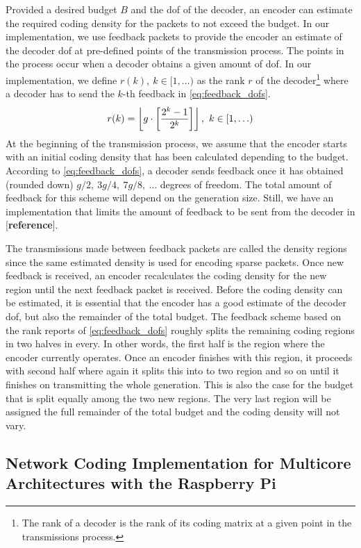 Provided a desired budget $B$ and the \ac{dof} of the decoder, an encoder
can estimate the required coding density for the packets to not exceed the
budget. In our implementation, we use feedback packets to provide the
encoder an estimate of the decoder \ac{dof} at pre-defined points of the
transmission process. The points in the process occur when a decoder
obtains a given amount of \ac{dof}. In our implementation, we define $r(k),\
k \in [1, \ldots)$ as the rank $r$ of the decoder\footnote{The rank of
a decoder is the rank of its coding matrix at a given point in the
transmissions process.} where a decoder has to send the $k$-th feedback in
\eqref{eq:feedback_dofs}.
%
\begin{equation}\label{eq:feedback_dofs}
    r(k) = \left\lfloor g\cdot \left[\frac{2^k -1}{2^k}\right]\right\rfloor,\ k \in [1,\ldots)
\end{equation}
%
At the beginning of the transmission process, we assume that the encoder
starts with an initial coding density that has been calculated depending to
the budget. According to \eqref{eq:feedback_dofs}, a decoder sends feedback
once it has obtained (rounded down) $g/2,\ 3g/4,\ 7g/8,\ \ldots$  degrees of
freedom. The total amount of feedback for this scheme will depend on the
generation size. Still, we have an implementation that limits the amount of
feedback to be sent from the decoder in [\textbf{reference}].

The transmissions made between feedback packets are called the density
regions since the same estimated density is used for encoding sparse
packets. Once new feedback is received, an encoder recalculates the coding
density for the new region until the next feedback packet is received.
Before the coding density can be estimated, it is essential that the
encoder has a good estimate of the decoder \ac{dof}, but also the remainder
of the total budget. The feedback scheme based on the rank reports of
\eqref{eq:feedback_dofs} roughly splits the remaining coding regions in
two halves in every. In other words, the first half is the region where
the encoder currently operates. Once an encoder finishes with this region,
it proceeds with second half where again it splits this into to two region
and so on until it finishes on transmitting the whole generation. This is
also the case for the budget that is split equally among the two new
regions. The very last region will be assigned the full remainder of
the total budget and the coding density will not vary.

\subsection{Network Coding Implementation for Multicore Architectures with
the Raspberry Pi}
\label{sub:implementation-multicore}

